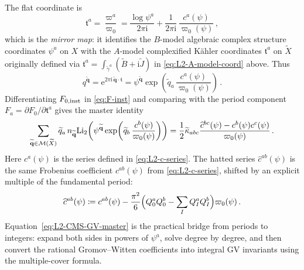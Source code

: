 The flat coordinate is
\begin{equation}\label{eq:L2-mirror-map}
    \mathfrak{t}^a
      =
      \frac{\varpi^a}{\varpi_0}
      =
      \frac{\log\psi^a}{2\pi\mathrm{i}}
      +\frac{1}{2\pi\mathrm{i}}\,
       \frac{c^a(\psi)}{\varpi_0(\psi)}\, ,
\end{equation}
which is the \emph{mirror map}: it identifies the $B$-model
algebraic complex structure coordinates $\psi^a$ on $X$ with the
$A$-model complexified K\"ahler coordinates $\mathfrak t^a$ on
$\widetilde X$ originally defined via $\mathfrak t^a =
\int_{\widetilde\gamma^{a}}(\widetilde B+\mathrm{i}\widetilde J)$ in
\eqref{eq:L2-A-model-coord} above.  Thus
\begin{equation}
    q^{\widetilde{\mathbf q}}
      =
      \mathrm{e}^{2\pi\mathrm{i}\,
        \widetilde{\mathbf q}\cdot\mathfrak{t}}
      =
      \psi^{\widetilde{\mathbf q}}
      \exp\!\left(
        \widetilde q_a\,\frac{c^a(\psi)}{\varpi_0(\psi)}
      \right)\, .
\end{equation}
Differentiating $F_{0,{\rm inst}}$ in
\eqref{eq:F-inst} and comparing with the period component
$F_a=\partial F_0/\partial\mathfrak{t}^a$ gives the master
identity
\begin{equation}\label{eq:L2-CMS-GV-master}
    \sum_{\widetilde{\mathbf q}\in\mathcal{M}(\widetilde X)}
    \widetilde q_a\,n_{\widetilde{\mathbf q}}
    \mathrm{Li}_2\!\left(
      \psi^{\widetilde{\mathbf q}}
      \exp\!\left(
        \widetilde q_b\,\frac{c^b(\psi)}{\varpi_0(\psi)}
      \right)
    \right)
    =
    \frac{1}{2}\widetilde\kappa_{abc}
    \frac{\widehat c^{bc}(\psi)-c^b(\psi)c^c(\psi)}
         {\varpi_0(\psi)}\, .
\end{equation}
Here $c^a(\psi)$ is the series defined in
\eqref{eq:L2-c-series}.
The hatted series $\widehat c^{ab}(\psi)$ is the same Frobenius
coefficient $c^{ab}(\psi)$ from \eqref{eq:L2-c-series}, shifted by an
explicit multiple of the fundamental period:
\begin{equation}\label{eq:L2-c-hat}
    \widehat c^{ab}(\psi)
      \coloneqq 
      c^{ab}(\psi)
      -\frac{\pi^2}{6}\Bigl(Q^a_0Q^b_0
        -\sum_I Q^a_IQ^b_I\Bigr)\varpi_0(\psi)\,  .
\end{equation}
Equation~\eqref{eq:L2-CMS-GV-master} is the practical bridge from
periods to integers: expand both sides in powers of $\psi^a$, solve
degree by degree, and then convert the rational Gromov--Witten
coefficients into integral GV invariants using the multiple-cover
formula.

